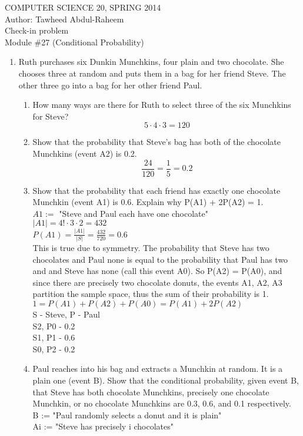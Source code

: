 \documentclass[12pt]{article}
\begin{document}
\begin{center}
COMPUTER SCIENCE 20, SPRING 2014 \\
Author: Tawheed Abdul-Raheem\\
Check-in problem \\
Module \#27 (Conditional Probability)
\smallskip
\end{center}

\begin{enumerate}
\item Ruth purchases six Dunkin Munchkins, four plain and two chocolate. She
chooses three at random and puts them in a bag for her friend Steve. The
other three go into a bag for her other friend Paul.
\begin{enumerate}
\item How many ways are there for Ruth to select three of the six Munchkins for Steve? \\
  \[5 \cdot 4 \cdot 3 = 120\]
\item Show that the probability that Steve's bag has both of the chocolate Munchkins (event A2) is 0.2.
  \[ \frac{24}{120} = \frac{1}{5} = 0.2 \]
\item Show that the probability that each friend has exactly one chocolate Munchkin (event A1) is 0.6. Explain why P(A1) + 2P(A2) = 1. \\
  $A1 := $ "Steve and Paul each have one chocolate" \\
  $|A1| = 4! \cdot 3 \cdot 2 = 432$ \\
  $P(A1) = \frac{|A1|}{|S|} = \frac{432}{720} = 0.6$ \\
  This is true due to symmetry. The probability that Steve has two chocolates and Paul none is equal to the probability that Paul has two and and Steve has none (call this event A0). So P(A2) = P(A0), and since there are precisely two chocolate donuts, the events A1, A2, A3 partition the sample space, thus the sum of their probability is 1. \\
  $1 = P(A1) + P(A2) + P(A0) = P(A1) + 2P(A2)$ \\
  S - Steve, P - Paul \\
  S2, P0 - 0.2 \\
  S1, P1 - 0.6 \\
  S0, P2 - 0.2

\item Paul reaches into his bag and extracts a Munchkin at random. It is a plain one (event B). Show that the conditional probability, given event B, that Steve has both chocolate Munchkins, precisely one chocolate Munchkin, or no chocolate Munchkins are 0.3, 0.6, and 0.1 respectively. \\
  B := "Paul randomly selects a donut and it is plain" \\
  Ai := "Steve has precisely i chocolates" \\


\end{enumerate}
\end{enumerate}
\end{document}
